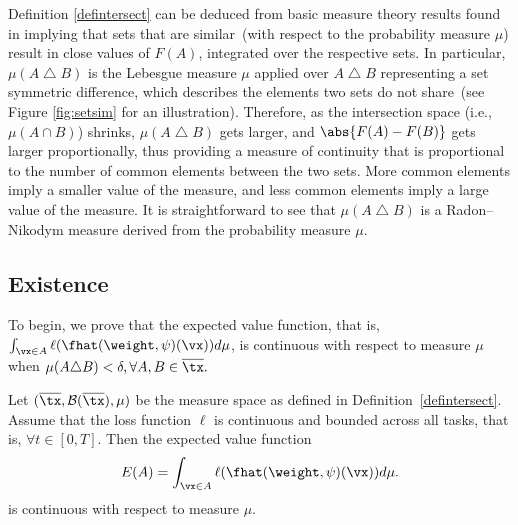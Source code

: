 Definition \ref{defintersect} can be deduced from basic measure 
theory results found in \cite{weaver2013measure} implying that 
sets that are similar~(with respect to the probability measure $\mu$) 
result in close values of $F(A)$, integrated over the respective sets. 
In particular, $\mu(A\bigtriangleup B)$ is the Lebesgue measure $\mu$
applied over $A\bigtriangleup B$ representing a set 
symmetric difference, which describes the elements 
two sets do not share~(see Figure  \ref{fig:setsim} 
for an illustration). Therefore, as the intersection space (i.e., $\mu(A\cap B)$) 
shrinks, $\mu(A\bigtriangleup B)$ gets larger, and $\abs{F(A)-F(B)}$ gets larger proportionally, thus providing a measure of continuity 
that is proportional to the number of common elements between the two sets. More common elements imply a smaller value of the measure, and less common elements 
imply a large value of the measure. 
It is straightforward to see that 
$\mu(A\bigtriangleup B)$  is a Radon--Nikodym measure derived from the probability measure $\mu.$



\subsection{Existence}
To begin, we prove that the expected value function, that is, $\int_{\vx\in A}
       \ell(\fhat(\weight,\psi
       )( \vx ) )d\mu$, is continuous with respect to measure $\mu$ when $\mu(A\triangle B)<\delta, \forall A, B \in \overline{\tx}.$ 
\begin{lemma}\label{lem:contMeasure}
    Let $(\overline{\tx},\mathcal{B}(\overline{\tx}), \mu)$ be the measure space as 
    defined in Definition~\ref{defintersect}. 
    Assume that the loss function $\ell$ is continuous 
    and bounded across all tasks, that is, $\forall t \in [0,T].$ 
    Then the expected value function 
    \begin{align}
        E(A) & = \int_{\vx\in A}
       \ell(\fhat(\weight,\psi
       )( \vx ) )d\mu.\\
    \end{align}
    is continuous with respect to measure $\mu$.
\end{lemma}


